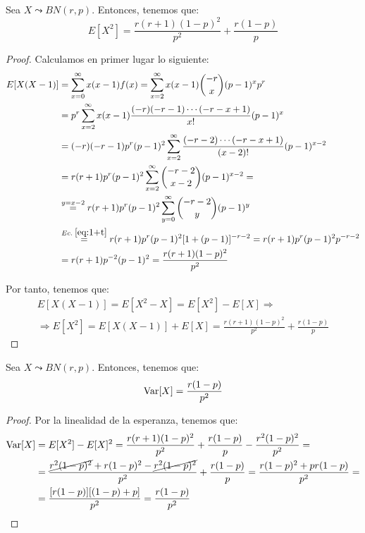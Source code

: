 \begin{lema}
    Sea $X\leadsto BN(r,p)$. Entonces, tenemos que:
    \begin{equation*}
        E[X^2]=\frac{r(r+1)(1-p)^2}{p^2} + \frac{r(1-p)}{p}
    \end{equation*}
\end{lema}
\begin{proof}
    Calculamos en primer lugar lo siguiente:
    \begin{equation*}\begin{split}
        E[X(X-1)]
        &= \sum_{x=0}^\infty x(x-1)f(x)
        = \sum_{x=2}^\infty x(x-1)\binom{-r}{x}(p-1)^xp^r \\
        &= p^r\sum_{x=2}^\infty x(x-1)\frac{(-r)(-r-1)\cdots (-r-x+1)}{x!}(p-1)^x \\
        &= (-r)(-r-1)p^r(p-1)^2\sum_{x=2}^\infty \frac{(-r-2)\cdots (-r-x+1)}{(x-2)!}(p-1)^{x-2} \\
        &= r(r+1)p^r(p-1)^2\sum_{x=2}^\infty \binom{-r-2}{x-2}(p-1)^{x-2} = \\
        &\stackrel{y=x-2}{=} r(r+1)p^r(p-1)^2\sum_{y=0}^\infty \binom{-r-2}{y}(p-1)^{y} \\
        &\stackrel{Ec.\;\ref{eq:1+t}}{=} r(r+1)p^r(p-1)^2[1+(p-1)]^{-r-2}
        = r(r+1)p^r(p-1)^2p^{-r-2} \\
        &= r(r+1)p^{-2}(p-1)^2
        = \frac{r(r+1)(1-p)^2}{p^2}
    \end{split}\end{equation*}

    Por tanto, tenemos que:
    \begin{multline*}
        E[X(X-1)] = E[X^2-X] = E[X^2] - E[X]
        \Longrightarrow \\ \Longrightarrow
        E[X^2] = E[X(X-1)] + E[X] = \frac{r(r+1)(1-p)^2}{p^2} + \frac{r(1-p)}{p}
    \end{multline*}
\end{proof}


\begin{coro}
    Sea $X\leadsto BN(r,p)$. Entonces, tenemos que:
    \begin{equation*}
        \operatorname{Var}[X]=\frac{r(1-p)}{p^2}
    \end{equation*}
\end{coro}
\begin{proof}
    Por la linealidad de la esperanza, tenemos que:
    \begin{equation*}\begin{split}
        \operatorname{Var}[X] &= E[X^2] - E[X]^2 = \frac{r(r+1)(1-p)^2}{p^2} + \frac{r(1-p)}{p} - \frac{r^2(1-p)^2}{p^2} =\\
        &=  \frac{\cancel{r^2(1-p)^2} +r(1-p)^2 - \cancel{r^2(1-p)^2}}{p^2} + \frac{r(1-p)}{p}
        = \frac{r(1-p)^2 + pr(1-p)}{p^2} =\\
        &= \frac{[r(1-p)][(1-p)+p]}{p^2}
        = \frac{r(1-p)}{p^2}
    \end{split}\end{equation*}
\end{proof}

